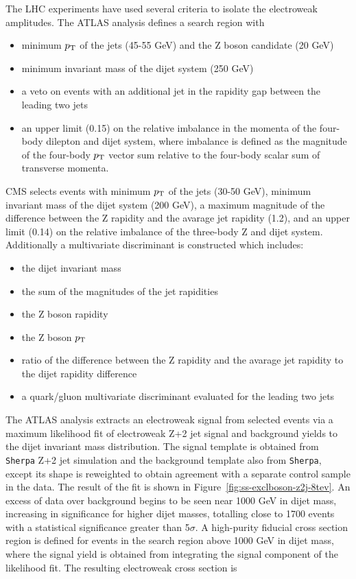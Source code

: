 The LHC experiments have used several criteria to isolate the electroweak amplitudes.  The ATLAS analysis
defines a search region with
\begin{itemize}
    \item minimum $p_{\mathrm{T}}$ of the jets (45-55 GeV) and the Z boson candidate (20 GeV)
    \item minimum invariant mass of the dijet system (250 GeV)
    \item a veto on events with an additional jet in the rapidity gap between the leading two jets
    \item an upper limit (0.15) on the relative imbalance in the momenta of the four-body dilepton and dijet system, where
    imbalance is defined as the magnitude of the four-body $p_{\mathrm{T}}$ vector sum relative to the four-body scalar sum of transverse momenta.
  \end{itemize}

CMS selects events with minimum $p_{\mathrm{T}}$ of the jets (30-50 GeV), minimum invariant mass of the dijet system (200 GeV), a maximum
magnitude of the difference between the Z rapidity and the avarage jet rapidity (1.2), and an upper
limit (0.14) on the relative imbalance of the three-body Z and dijet system.
Additionally a multivariate discriminant is constructed which includes:
\begin{itemize}
  \item the dijet invariant mass
  \item the sum of the magnitudes of the jet rapidities
  \item the Z boson rapidity
  \item the Z boson $p_{\mathrm{T}}$
  \item ratio of the difference between the Z rapidity and the avarage jet rapidity to the dijet rapidity difference
  \item a quark/gluon multivariate discriminant evaluated for the leading two jets
\end{itemize}

The ATLAS analysis extracts an electroweak signal from selected events via a maximum likelihood fit
of electroweak Z+2 jet signal and background yields to the dijet invariant mass distribution.
The signal template is obtained from \texttt{Sherpa} Z+2 jet simulation and the background template also from \texttt{Sherpa},
except its shape is reweighted to obtain agreement with a separate control sample in the data.
The result of the fit is shown in Figure~\ref{fig:ss-exclboson-z2j-8tev}.  An excess of data over background begins to be seen
near 1000 GeV in dijet mass, increasing in significance for higher dijet masses, totalling close to 1700 events with a statistical
significance greater than 5$\sigma$.   A high-purity fiducial cross section region is defined for events in the search
region above 1000 GeV in dijet mass, where the signal yield is obtained from integrating the signal component of the likelihood fit.
The resulting electroweak cross section is

